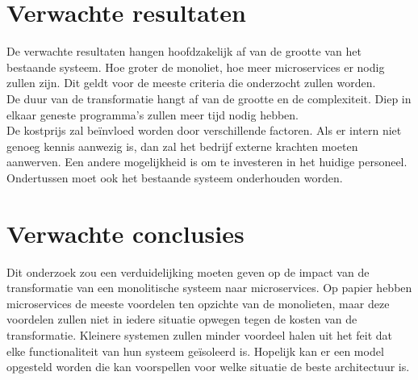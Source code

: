 \section{Verwachte resultaten}
\label{sec:verwachte_resultaten}

De verwachte resultaten hangen hoofdzakelijk af van de grootte van het bestaande systeem. Hoe groter de monoliet, hoe meer microservices er nodig zullen zijn. Dit geldt voor de meeste criteria die onderzocht zullen worden.\\
De duur van de transformatie hangt af van de grootte en de complexiteit. Diep in elkaar geneste programma's zullen meer tijd nodig hebben.\\
De kostprijs zal beïnvloed worden door verschillende factoren. Als er intern niet genoeg kennis aanwezig is, dan zal het bedrijf externe krachten moeten aanwerven. Een andere mogelijkheid is om te investeren in het huidige personeel. Ondertussen moet ook het bestaande systeem onderhouden worden.

\section{Verwachte conclusies}
\label{sec:verwachte_conclusies}
Dit onderzoek zou een verduidelijking moeten geven op de impact van de transformatie van een monolitische systeem naar microservices. Op papier hebben microservices de meeste voordelen ten opzichte van de monolieten, maar deze voordelen zullen niet in iedere situatie opwegen tegen de kosten van de transformatie. Kleinere systemen zullen minder voordeel halen uit het feit dat elke functionaliteit van hun systeem geïsoleerd is. 
Hopelijk kan er een model opgesteld worden die kan voorspellen voor welke situatie de beste architectuur is.


